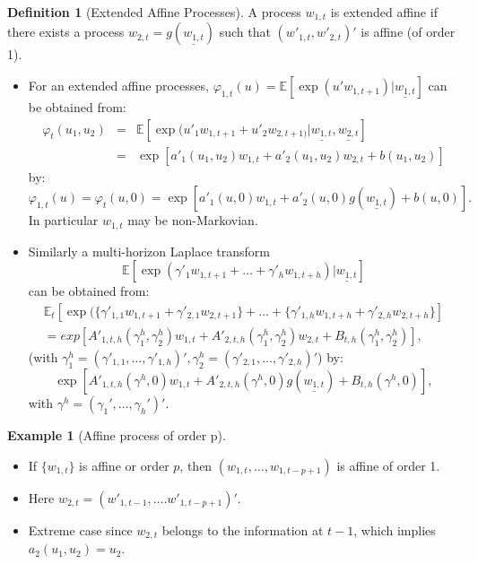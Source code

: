 \documentclass[
  12pt,
]{book}
\providecommand{\tightlist}{%
  \setlength{\itemsep}{0pt}\setlength{\parskip}{0pt}}
\theoremstyle{definition}
\newtheorem{definition}{Definition}[chapter]
\theoremstyle{definition}
\newtheorem{example}{Example}[chapter]
\theoremstyle{definition}
\theoremstyle{definition}
\theoremstyle{remark}
\begin{document}
\begin{definition}[Extended Affine Processes]
\protect\hypertarget{def:ExtAffine}{}\label{def:ExtAffine}A process \(w_{1,t}\) is extended affine if there exists a process \(w_{2,t} = g(\underline{w_{1,t}})\) such that \((w'_{1,t}, w'_{2,t})'\) is affine (of order 1).
\end{definition}

\begin{itemize}
\item
  For an extended affine processes, \(\varphi_{1,t}(u) = \mathbb{E}[\exp(u'w_{1,t+1})|\underline{w_{1,t}}]\) can be obtained from:
  \begin{eqnarray*}
  \varphi_t(u_1, u_2) &=& \mathbb{E}[\exp(u'_1w_{1,t+1}+u'_2 w_{2,t+1)}|\underline{w_{1,t}}, \underline{w_{2,t}}] \\
  &=& \exp[a'_1(u_1,u_2)w_{1,t} + a'_2(u_1,u_2)w_{2,t}+b(u_1,u_2)]
  \end{eqnarray*}
  by:
  \[
  \varphi_{1,t}(u) = \varphi_t(u, 0) = \exp[a'_1(u,0)w_{1,t}+a'_2(u,0)g(\underline{w_{1,t}}) + b(u, 0)].
  \]
  In particular \(w_{1,t}\) may be non-Markovian.
\item
  Similarly a multi-horizon Laplace transform
  \[
  \mathbb{E}[\exp(\gamma'_{1}w_{1,t+1}+\dots+\gamma'_{h}w_{1,t+h})|\underline{w_{1,t}}]
  \]
  can be obtained from:
  \begin{eqnarray*}
   \mathbb{E}_t[\exp(\{\gamma'_{1,1}w_{1,t+1}+\gamma'_{2,1}w_{2,t+1}\}+\dots+ \{\gamma'_{1,h}w_{1,t+h}+\gamma'_{2,h}w_{2,t+h}\}] \\
  = exp[A'_{1,t,h}(\gamma^h_1, \gamma^h_2)w_{1,t}+A'_{2,t,h}(\gamma^h_1, \gamma^h_2)w_{2,t}+B_{t,h}(\gamma^h_1, \gamma^h_2)],
  \end{eqnarray*}
  (with \(\gamma^h_1 = (\gamma'_{1,1},\dots, \gamma'_{1,h})', \gamma^h_2 = (\gamma'_{2,1},\dots, \gamma'_{2,h})'\)) by:
  \[
  \exp[A'_{1,t,h}(\gamma^h,0) w_{1,t} + A'_{2,t,h}(\gamma^h,0)g (\underline{w_{1,t}}) + B_{t,h}(\gamma^h,0)],
  \]
  with \(\gamma^h = (\gamma_1',\dots,\gamma_h')'\).
\end{itemize}

\begin{example}[Affine process of order p]
\protect\hypertarget{exm:AffProcessOrderp}{}\label{exm:AffProcessOrderp}\leavevmode

\begin{itemize}
\tightlist
\item
  If \(\{w_{1,t}\}\) is affine or order \(p\), then \((w_{1,t},\dots,w_{1,t-p+1})\) is affine of order 1.
\item
  Here \(w_{2,t} = (w'_{1,t-1}, \dots.w'_{1,t-p+1})'\).
\item
  Extreme case since \(w_{2,t}\) belongs to the information at \(t-1\), which implies \(a_2(u_1, u_2) = u_2\).
\end{itemize}

\end{example}
\end{document}
